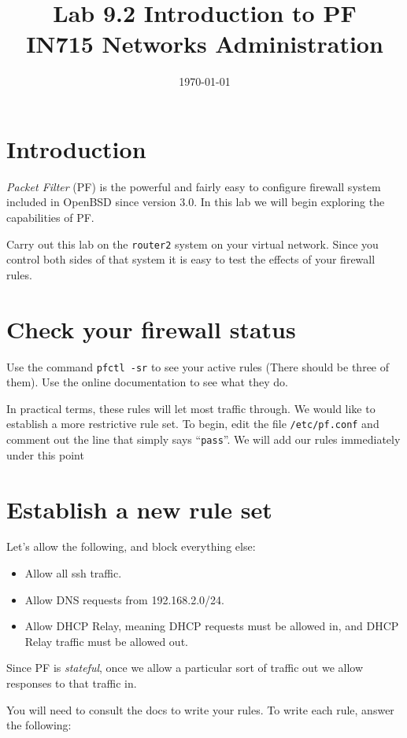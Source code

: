 \documentclass{article}
\begin{document}
\title{ Lab 9.2 Introduction to PF\\ IN715 Networks Administration}
\date{\today}
\maketitle

\section*{Introduction}
\emph{Packet Filter} (PF) is the powerful and fairly easy to configure firewall system included in OpenBSD since version 3.0.  In this lab we will begin exploring the capabilities of PF.

Carry out this lab on the \texttt{router2} system on your virtual network.  Since you control both sides of that system it is easy to test the effects of your firewall rules.

\section{Check your firewall status}
Use the command \texttt{pfctl -sr} to see your active rules (There should be three of them).  Use the 
online documentation to see what they do.

In practical terms, these rules will let most traffic through.  We would like to establish a more restrictive rule set.  To begin, edit the file \texttt{/etc/pf.conf} and comment out the line that simply says ``\texttt{pass}''.  We will add our rules immediately under this point

\section{Establish a new rule set}
Let's allow the following, and block everything else:

\begin{itemize}
	\item Allow all ssh traffic.
	\item Allow DNS requests from 192.168.2.0/24.
	\item Allow DHCP Relay, meaning DHCP requests must be allowed in, and DHCP Relay 
		traffic must be allowed out.
\end{itemize}

Since PF is \emph{stateful}, once we allow a particular sort of traffic out we allow responses to that traffic in.

You will need to consult the docs to write your rules.  To write each rule, answer the following:
\end{document}
